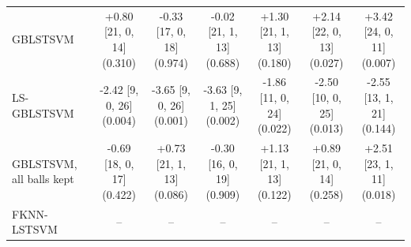 \begin{table}[!t]
{\begin{tabular}{lcccccc}
GBLSTSVM & \shortstack{+0.80 [21, 0, 14]\\(0.310)} & \shortstack{-0.33 [17, 0, 18]\\(0.974)} & \shortstack{-0.02 [21, 1, 13]\\(0.688)} & \shortstack{+1.30 [21, 1, 13]\\(0.180)} & \shortstack{+2.14 [22, 0, 13]\\(0.027)} & \shortstack{+3.42 [24, 0, 11]\\(0.007)} \\[4pt]
LS-GBLSTSVM & \shortstack{-2.42 [9, 0, 26]\\(0.004)} & \shortstack{-3.65 [9, 0, 26]\\(0.001)} & \shortstack{-3.63 [9, 1, 25]\\(0.002)} & \shortstack{-1.86 [11, 0, 24]\\(0.022)} & \shortstack{-2.50 [10, 0, 25]\\(0.013)} & \shortstack{-2.55 [13, 1, 21]\\(0.144)} \\[4pt]
GBLSTSVM, all balls kept & \shortstack{-0.69 [18, 0, 17]\\(0.422)} & \shortstack{+0.73 [21, 1, 13]\\(0.086)} & \shortstack{-0.30 [16, 0, 19]\\(0.909)} & \shortstack{+1.13 [21, 1, 13]\\(0.122)} & \shortstack{+0.89 [21, 0, 14]\\(0.258)} & \shortstack{+2.51 [23, 1, 11]\\(0.018)} \\[4pt]
FKNN-LSTSVM & -- & -- & -- & -- & -- & -- \\[4pt]
\bottomrule
\end{tabular}}
\end{table}
